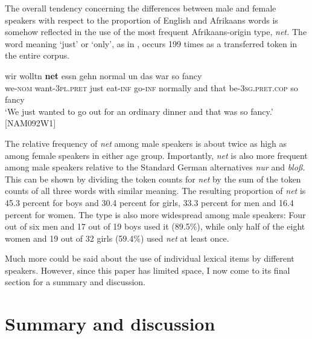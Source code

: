 \documentclass[output=paper]{langsci/langscibook}
\begin{document}
The overall tendency concerning the differences between male and female speakers with respect to the proportion of English and Afrikaans words is somehow reflected in the use of the most frequent Afrikaans-origin type, \textit{net.} The word meaning ‘just’ or ‘only’, as in , occurs 199 times as a transferred token in the entire corpus.

\ea
\label{ex:bracke:8}
\gll wir wolltn \textbf{net} essn gehn normal un das war so fancy\\
     we-\textsc{nom} want-\textsc{3pl.pret} just eat-\textsc{inf} go-\textsc{inf} normally and that be-\textsc{3sg.pret.cop} so fancy\\
\glt `We just wanted to go out for an ordinary dinner and that was so fancy.' {[}NAM092W1{]}
\z

The relative frequency of \textit{net} among male speakers is about twice as high as among female speakers in either age group. Importantly, \textit{net} is also more frequent among male speakers relative to the Standard German alternatives \textit{nur} and \textit{bloß.} This can be shown by dividing the token counts for \textit{net} by the sum of the token counts of all three words with similar meaning. The resulting proportion of \textit{net} is 45.3 percent for boys and 30.4 percent for girls, 33.3 percent for men and 16.4 percent for women. The type is also more widespread among male speakers: Four out of six men and 17 out of 19 boys used it (89.5\%), while only half of the eight women and 19 out of 32 girls (59.4\%) used \textit{net} at least once.

Much more could be said about the use of individual lexical items by different speakers. However, since this paper has limited space, I now come to its final section for a summary and discussion.

 
\section{Summary and discussion}
\label{sec:bracke:6}
 
\end{document}
